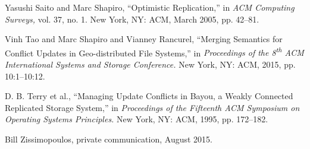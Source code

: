Yasushi Saito and Marc Shapiro,
``Optimistic Replication,''
in \emph{ACM Computing Surveys,}
vol. 37, no. 1.
New York, NY: ACM, March 2005,
pp. 42--81.

Vinh Tao and Marc Shapiro and Vianney Rancurel,
``Merging Semantics for Conflict Updates in Geo-distributed File Systems,''
in \emph{Proceedings of the 8\textsuperscript{th}
 ACM International Systems and Storage Conference.}
New York, NY: ACM, 2015, pp. 10:1--10:12.

D. B. Terry et al.,
``Managing Update Conflicts in Bayou, a Weakly Connected Replicated Storage System,''
in \emph{Proceedings of the Fifteenth ACM Symposium on Operating Systems Principles.}
New York, NY: ACM, 1995, pp. 172--182.

Bill Zissimopoulos, private communication, August 2015.

